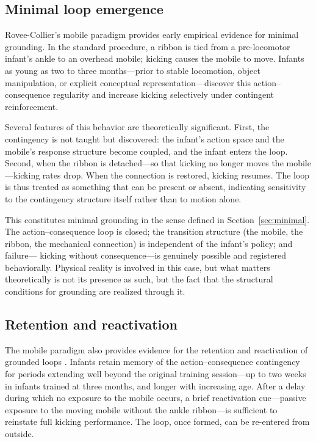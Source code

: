 \documentclass[11pt]{article}
\begin{document}
\subsection{Minimal loop emergence}
\label{sec:loop-emergence}

Rovee-Collier's mobile paradigm provides early empirical evidence for
minimal grounding. In the standard procedure, a ribbon is tied from a
pre-locomotor infant's ankle to an overhead mobile; kicking causes the
mobile to move. Infants as young as two to three months---prior to
stable locomotion, object manipulation, or explicit conceptual
representation---discover this action--consequence regularity and
increase kicking selectively under contingent reinforcement.

Several features of this behavior are theoretically significant.
First, the contingency is not taught but discovered: the infant's
action space and the mobile's response structure become coupled, and
the infant enters the loop. Second, when the ribbon is detached---so
that kicking no longer moves the mobile---kicking rates drop. When
the connection is restored, kicking resumes. The loop is thus treated
as something that can be present or absent, indicating sensitivity to
the contingency structure itself rather than to motion alone.

This constitutes minimal grounding in the sense defined in
Section~\ref{sec:minimal}. The action--consequence loop is closed;
the transition structure (the mobile, the ribbon, the mechanical
connection) is independent of the infant's policy; and failure---
kicking without consequence---is genuinely possible and registered
behaviorally. Physical reality is involved in this case, but what
matters theoretically is not its presence as such, but the fact that
the structural conditions for grounding are realized through it.

\subsection{Retention and reactivation}
\label{sec:retention}

The mobile paradigm also provides evidence for the retention and
reactivation of grounded loops \citep{RoveeCollier1980}. Infants
retain memory of the action--consequence contingency for periods
extending well beyond the original training session---up to two weeks
in infants trained at three months, and longer with increasing age.
After a delay during which no exposure to the mobile occurs, a brief
reactivation cue---passive exposure to the moving mobile without the
ankle ribbon---is sufficient to reinstate full kicking performance.
The loop, once formed, can be re-entered from outside.
\end{document}
